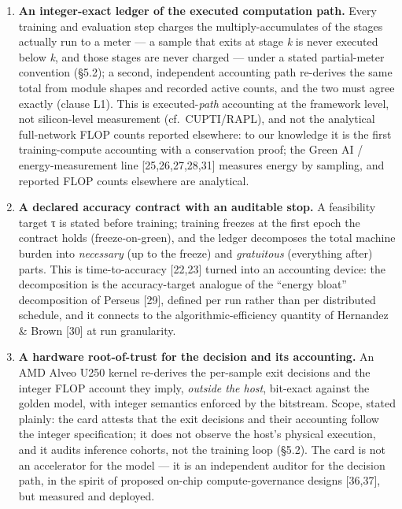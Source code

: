 \documentclass[
]{article}
\providecommand{\tightlist}{%
  \setlength{\itemsep}{0pt}\setlength{\parskip}{0pt}}
\begin{document}
\begin{enumerate}
\def\labelenumi{\arabic{enumi}.}
\tightlist
\item
  \textbf{An integer-exact ledger of the executed computation path.}
  Every training and evaluation step charges the multiply-accumulates of
  the stages actually run to a meter --- a sample that exits at stage
  \emph{k} is never executed below \emph{k}, and those stages are never
  charged --- under a stated partial-meter convention (§5.2); a second,
  independent accounting path re-derives the same total from module
  shapes and recorded active counts, and the two must agree exactly
  (clause L1). This is executed-\emph{path} accounting at the framework
  level, not silicon-level measurement (cf.~CUPTI/RAPL), and not the
  analytical full-network FLOP counts reported elsewhere: to our
  knowledge it is the first training-compute accounting with a
  conservation proof; the Green AI / energy-measurement line
  {[}25,26,27,28,31{]} measures energy by sampling, and reported FLOP
  counts elsewhere are analytical.
\item
  \textbf{A declared accuracy contract with an auditable stop.} A
  feasibility target τ is stated before training; training freezes at
  the first epoch the contract holds (freeze-on-green), and the ledger
  decomposes the total machine burden into \emph{necessary} (up to the
  freeze) and \emph{gratuitous} (everything after) parts. This is
  time-to-accuracy {[}22,23{]} turned into an accounting device: the
  decomposition is the accuracy-target analogue of the ``energy bloat''
  decomposition of Perseus {[}29{]}, defined per run rather than per
  distributed schedule, and it connects to the algorithmic-efficiency
  quantity of Hernandez \& Brown {[}30{]} at run granularity.
\item
  \textbf{A hardware root-of-trust for the decision and its accounting.}
  An AMD Alveo U250 kernel re-derives the per-sample exit decisions and
  the integer FLOP account they imply, \emph{outside the host},
  bit-exact against the golden model, with integer semantics enforced by
  the bitstream. Scope, stated plainly: the card attests that the exit
  decisions and their accounting follow the integer specification; it
  does not observe the host's physical execution, and it audits
  inference cohorts, not the training loop (§5.2). The card is not an
  accelerator for the model --- it is an independent auditor for the
  decision path, in the spirit of proposed on-chip compute-governance
  designs {[}36,37{]}, but measured and deployed.
\end{enumerate}
\end{document}

